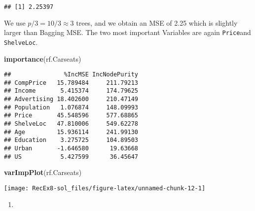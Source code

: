 \documentclass[
]{article}
\newenvironment{Shaded}{\begin{snugshade}}{\end{snugshade}}
\newcommand{\FunctionTok}[1]{\textcolor[rgb]{0.13,0.29,0.53}{\textbf{#1}}}
\newcommand{\NormalTok}[1]{#1}
\providecommand{\tightlist}{%
  \setlength{\itemsep}{0pt}\setlength{\parskip}{0pt}}
\begin{document}
\begin{verbatim}
## [1] 2.25397
\end{verbatim}

We use \(p/3 = 10/3 \approx  3\) trees, and we obtain an MSE of 2.25
which is slightly larger than Bagging MSE. The two most important
Variables are again \texttt{Price}and \texttt{ShelveLoc}.

\begin{Shaded}
\begin{Highlighting}[]
\FunctionTok{importance}\NormalTok{(rf.Carseats)}
\end{Highlighting}
\end{Shaded}

\begin{verbatim}
##               %IncMSE IncNodePurity
## CompPrice   15.789484     211.79213
## Income       5.415374     174.79625
## Advertising 18.402600     210.47149
## Population   1.076874     148.09993
## Price       45.548596     577.68865
## ShelveLoc   47.810006     549.62278
## Age         15.936114     241.99130
## Education    3.275725     104.89503
## Urban       -1.646580      19.63668
## US           5.427599      36.45647
\end{verbatim}

\begin{Shaded}
\begin{Highlighting}[]
\FunctionTok{varImpPlot}\NormalTok{(rf.Carseats)}
\end{Highlighting}
\end{Shaded}

\texttt{[image: RecEx8-sol\_files/figure-latex/unnamed-chunk-12-1]}

\begin{enumerate}
\def\labelenumi{\alph{enumi})}
\setcounter{enumi}{5}
\tightlist
\item
\end{enumerate}
\end{document}
